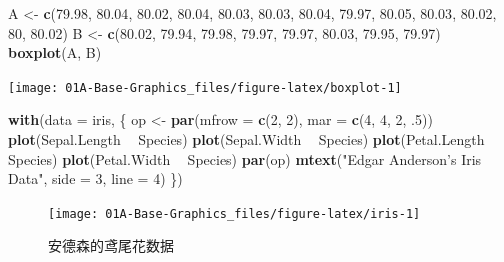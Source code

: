 \documentclass[a4paper,oneside,UTF8]{book}
\newenvironment{Shaded}{\begin{snugshade}}{\end{snugshade}}
\newcommand{\DataTypeTok}[1]{\textcolor[rgb]{0.13,0.29,0.53}{#1}}
\newcommand{\DecValTok}[1]{\textcolor[rgb]{0.00,0.00,0.81}{#1}}
\newcommand{\FloatTok}[1]{\textcolor[rgb]{0.00,0.00,0.81}{#1}}
\newcommand{\KeywordTok}[1]{\textcolor[rgb]{0.13,0.29,0.53}{\textbf{#1}}}
\newcommand{\NormalTok}[1]{#1}
\newcommand{\OperatorTok}[1]{\textcolor[rgb]{0.81,0.36,0.00}{\textbf{#1}}}
\newcommand{\StringTok}[1]{\textcolor[rgb]{0.31,0.60,0.02}{#1}}
\begin{document}
\begin{Shaded}
\begin{Highlighting}[]
\NormalTok{A <-}\StringTok{ }\KeywordTok{c}\NormalTok{(}\FloatTok{79.98}\NormalTok{, }\FloatTok{80.04}\NormalTok{, }\FloatTok{80.02}\NormalTok{, }\FloatTok{80.04}\NormalTok{, }\FloatTok{80.03}\NormalTok{, }\FloatTok{80.03}\NormalTok{, }\FloatTok{80.04}\NormalTok{, }\FloatTok{79.97}\NormalTok{,}
       \FloatTok{80.05}\NormalTok{, }\FloatTok{80.03}\NormalTok{, }\FloatTok{80.02}\NormalTok{, }\DecValTok{80}\NormalTok{, }\FloatTok{80.02}\NormalTok{)}
\NormalTok{B <-}\StringTok{ }\KeywordTok{c}\NormalTok{(}\FloatTok{80.02}\NormalTok{, }\FloatTok{79.94}\NormalTok{, }\FloatTok{79.98}\NormalTok{, }\FloatTok{79.97}\NormalTok{, }\FloatTok{79.97}\NormalTok{, }\FloatTok{80.03}\NormalTok{, }\FloatTok{79.95}\NormalTok{, }\FloatTok{79.97}\NormalTok{)}
\KeywordTok{boxplot}\NormalTok{(A, B)}
\end{Highlighting}
\end{Shaded}

\begin{center}\texttt{[image: 01A-Base-Graphics\_files/figure-latex/boxplot-1]} \end{center}

\begin{Shaded}
\begin{Highlighting}[]
\KeywordTok{with}\NormalTok{(}\DataTypeTok{data =}\NormalTok{ iris, \{}
\NormalTok{  op <-}\StringTok{ }\KeywordTok{par}\NormalTok{(}\DataTypeTok{mfrow =} \KeywordTok{c}\NormalTok{(}\DecValTok{2}\NormalTok{, }\DecValTok{2}\NormalTok{), }\DataTypeTok{mar =} \KeywordTok{c}\NormalTok{(}\DecValTok{4}\NormalTok{, }\DecValTok{4}\NormalTok{, }\DecValTok{2}\NormalTok{, }\FloatTok{.5}\NormalTok{))}
  \KeywordTok{plot}\NormalTok{(Sepal.Length }\OperatorTok{~}\StringTok{ }\NormalTok{Species)}
  \KeywordTok{plot}\NormalTok{(Sepal.Width }\OperatorTok{~}\StringTok{ }\NormalTok{Species)}
  \KeywordTok{plot}\NormalTok{(Petal.Length }\OperatorTok{~}\StringTok{ }\NormalTok{Species)}
  \KeywordTok{plot}\NormalTok{(Petal.Width }\OperatorTok{~}\StringTok{ }\NormalTok{Species)}
  \KeywordTok{par}\NormalTok{(op)}
  \KeywordTok{mtext}\NormalTok{(}\StringTok{"Edgar Anderson's Iris Data"}\NormalTok{, }\DataTypeTok{side =} \DecValTok{3}\NormalTok{, }\DataTypeTok{line =} \DecValTok{4}\NormalTok{)}
\NormalTok{\})}
\end{Highlighting}
\end{Shaded}

\begin{figure}

{\centering \texttt{[image: 01A-Base-Graphics\_files/figure-latex/iris-1]} 

}

\caption{安德森的鸢尾花数据}\label{fig:iris}
\end{figure}
\end{document}
